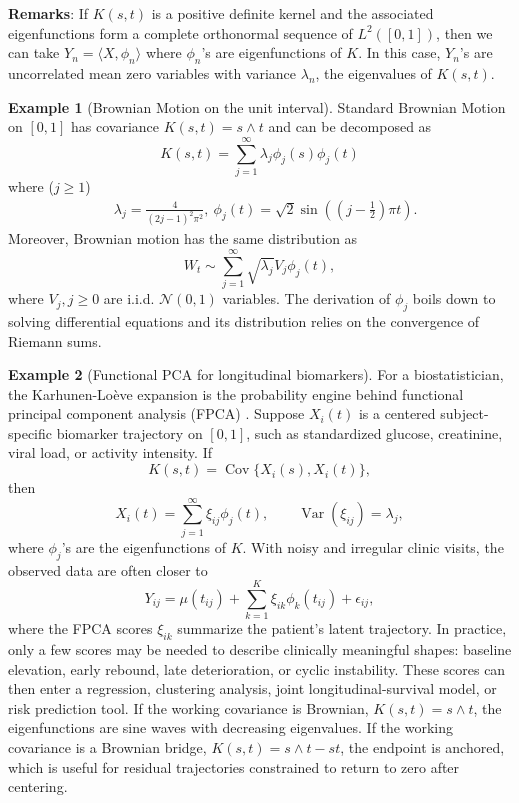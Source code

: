 \documentclass{article}
\theoremstyle{plain}
\theoremstyle{definition}
\newtheorem{example}{Example}
\begin{document}
\textbf{Remarks}: If $K(s,t)$ is a positive definite kernel and the associated eigenfunctions form a complete orthonormal sequence of $L^2([0,1])$, then we can take $Y_n = \langle X, \phi_n \rangle$ where $\phi_n$'s are eigenfunctions of $K$. In this case, $Y_n$'s are uncorrelated mean zero variables with variance $\lambda_n$, the eigenvalues of $K(s,t)$.

\begin{example}[Brownian Motion on the unit interval]
Standard Brownian Motion on $[0,1]$ has covariance $K(s,t) = s \wedge t$ and can be decomposed as
\[
K(s,t) = \sum_{j=1}^\infty \lambda_j \phi_j(s)\phi_j(t)
\]
where ($j\ge 1$)
\begin{align*}
    &\lambda_j = \frac{4}{(2j-1)^2\pi^2},\ \phi_j(t) = \sqrt{2}\sin\left(\left(j-\frac{1}{2}\right)\pi t\right).
\end{align*}
Moreover, Brownian motion has the same distribution as
\[
W_t \sim \sum_{j=1}^\infty\sqrt{\lambda_j}V_j\phi_j(t),
\]
where $V_j, j\ge 0$ are i.i.d. $\mathcal{N}(0,1)$ variables. The derivation of $\phi_j$ boils down to solving differential equations and its distribution relies on the convergence of Riemann sums.
\end{example}

\begin{example}[Functional PCA for longitudinal biomarkers]
For a biostatistician, the Karhunen-Loève expansion is the probability engine behind functional principal component analysis (FPCA) \citep{ramsay2005functional,yao2005functional}. Suppose \(X_i(t)\) is a centered subject-specific biomarker trajectory on \([0,1]\), such as standardized glucose, creatinine, viral load, or activity intensity. If
\[
K(s,t)=\operatorname{Cov}\{X_i(s),X_i(t)\},
\]
then
\[
X_i(t)=\sum_{j=1}^{\infty}\xi_{ij}\phi_j(t),
\qquad
\operatorname{Var}(\xi_{ij})=\lambda_j,
\]
where \(\phi_j\)'s are the eigenfunctions of \(K\). With noisy and irregular clinic visits, the observed data are often closer to
\[
Y_{ij}=\mu(t_{ij})+\sum_{k=1}^{K}\xi_{ik}\phi_k(t_{ij})+\epsilon_{ij},
\]
where the FPCA scores \(\xi_{ik}\) summarize the patient's latent trajectory. In practice, only a few scores may be needed to describe clinically meaningful shapes: baseline elevation, early rebound, late deterioration, or cyclic instability. These scores can then enter a regression, clustering analysis, joint longitudinal-survival model, or risk prediction tool. If the working covariance is Brownian, \(K(s,t)=s\wedge t\), the eigenfunctions are sine waves with decreasing eigenvalues. If the working covariance is a Brownian bridge, \(K(s,t)=s\wedge t-st\), the endpoint is anchored, which is useful for residual trajectories constrained to return to zero after centering.
\end{example}
\end{document}
